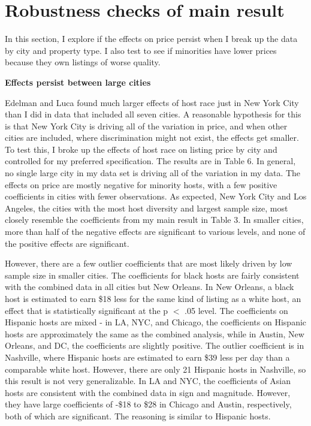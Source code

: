 \section{Robustness checks of main result} 

In this section, I explore if the effects on price persist when I break up the data by city and property type. I also test to see if minorities have lower prices because they own listings of worse quality. 

\textbf{Effects persist between large cities}

Edelman and Luca found much larger effects of host race just in New York City than I did in data that included all seven cities. A reasonable hypothesis for this is that New York City is driving all of the variation in price, and when other cities are included, where discrimination might not exist, the effects get smaller. To test this, I broke up the effects of host race on listing price by city and controlled for my preferred specification. The results are in Table 6. In general, no single large city in my data set is driving all of the variation in my data. The effects on price are mostly negative for minority hosts, with a few positive coefficients in cities with fewer observations. As expected, New York City and Los Angeles, the cities with the most host diversity and largest sample size, most closely resemble the coefficients from my main result in Table 3. In smaller cities, more than half of the negative effects are significant to various levels, and none of the positive effects are significant. 

However, there are a few outlier coefficients that are most likely driven by low sample size in smaller cities. The coefficients for black hosts are fairly consistent with the combined data in all cities but New Orleans. In New Orleans, a black host is estimated to earn \$18 less for the same kind of listing as a white host, an effect that is statistically significant at the p $<$ .05 level. The coefficients on Hispanic hosts are mixed - in LA, NYC, and Chicago, the coefficients on Hispanic hosts are approximately the same as the combined analysis, while in Austin, New Orleans, and DC, the coefficients are slightly positive. The outlier coefficient is in Nashville, where Hispanic hosts are estimated to earn \$39 less per day than a comparable white host. However, there are only 21 Hispanic hosts in Nashville, so this result is not very generalizable. In LA and NYC, the coefficients of Asian hosts are consistent with the combined data in sign and magnitude. However, they have large coefficients of -\$18 to \$28 in Chicago and Austin, respectively, both of which are significant. The reasoning is similar to Hispanic hosts. 


